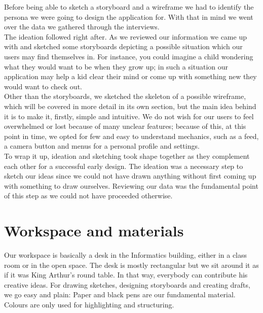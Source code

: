\documentclass[12pt]{scrartcl}
\begin{document}
	Before being able to sketch a storyboard and a wireframe we had to identify the persona we 
	were going to design the application for. With that in mind we went over the data we gathered
	through the interviews.\\
	
	The ideation followed right after. As we reviewed our information we came up with and sketched 
	some storyboards depicting a possible situation which our users may find themselves in. 
	For instance, you could imagine a child wondering what they would want to be when they grow
	up; in such a situation our application may help a kid clear their mind or come up with something
	new they would want to check out.\\
	
	Other than the storyboards, we sketched the skeleton of a possible wireframe, which will be
	covered in more detail in its own section, but the main idea behind it is to make it, firstly,
	simple and intuitive. We do not wish for our users to feel overwhelmed or lost because of
	many unclear features; because of this, at this point in time, we opted for few and easy to
	understand mechanics, such as a feed, a camera button and menus for a personal profile and
	settings.\\
	
	To wrap it up, ideation and sketching took shape together as they complement each other for
	a successful early design. The ideation was a necessary step to sketch our ideas since we
	could not have drawn anything without first coming up with something to draw ourselves.
	Reviewing our data was the fundamental point of this step as we could not have proceeded
	otherwise.

\section{Workspace and materials}

	Our workspace is basically a desk in the Informatics building, either in a class room or in the open space. The desk is mostly rectangular 
	but we sit around it as if it was King Arthur's round table. In that way, everybody can contribute his creative ideas. For drawing sketches, 
	designing storyboards and creating drafts, we go easy and plain: Paper and black pens are our fundamental material. 
	Colours are only used for highlighting and structuring.\\
	
\end{document}

